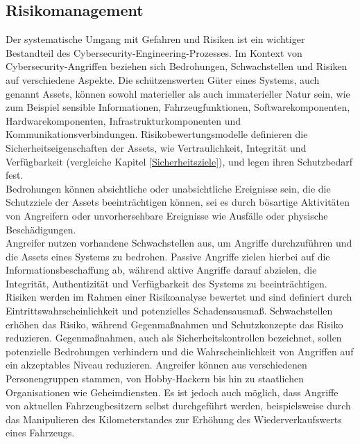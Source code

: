 \subsection{Risikomanagement}
Der systematische Umgang mit Gefahren und Risiken ist ein wichtiger Bestandteil des Cybersecurity-Engineering-Prozesses. Im Kontext von Cybersecurity-Angriffen beziehen sich Bedrohungen, Schwachstellen und Risiken auf verschiedene Aspekte. Die schützenswerten Güter eines Systems, auch genannt Assets, können sowohl materieller als auch immaterieller Natur sein, wie zum Beispiel sensible Informationen, Fahrzeugfunktionen, Softwarekomponenten, Hardwarekomponenten, Infrastrukturkomponenten und Kommunikationsverbindungen. Risikobewertungsmodelle definieren die Sicherheitseigenschaften der Assets, wie Vertraulichkeit, Integrität und Verfügbarkeit (vergleiche Kapitel \ref{Sicherheitsziele}), und legen ihren Schutzbedarf fest. \cite[5]{Wurm.2022}\\
Bedrohungen können absichtliche oder unabsichtliche Ereignisse sein, die die Schutzziele der Assets beeinträchtigen können, sei es durch bösartige Aktivitäten von Angreifern oder unvorhersehbare Ereignisse wie Ausfälle oder physische Beschädigungen. \\
Angreifer nutzen vorhandene Schwachstellen aus, um Angriffe durchzuführen und die Assets eines Systems zu bedrohen. Passive Angriffe zielen hierbei auf die Informationsbeschaffung ab, während aktive Angriffe darauf abzielen, die Integrität, Authentizität und Verfügbarkeit des Systems zu beeinträchtigen. \\
Risiken werden im Rahmen einer Risikoanalyse bewertet und sind definiert durch Eintrittswahrscheinlichkeit und potenzielles Schadensausmaß. Schwachstellen erhöhen das Risiko, während Gegenmaßnahmen und Schutzkonzepte das Risiko reduzieren. Gegenmaßnahmen, auch als Sicherheitskontrollen bezeichnet, sollen potenzielle Bedrohungen verhindern und die Wahrscheinlichkeit von Angriffen auf ein akzeptables Niveau reduzieren. Angreifer können aus verschiedenen Personengruppen stammen, von Hobby-Hackern bis hin zu staatlichen Organisationen wie Geheimdiensten. Es ist jedoch auch möglich, dass Angriffe von aktuellen Fahrzeugbesitzern selbst durchgeführt werden, beispielsweise durch das Manipulieren des Kilometerstandes zur Erhöhung des Wiederverkaufswerts eines Fahrzeugs. \cite[5\psq]{Wurm.2022}

